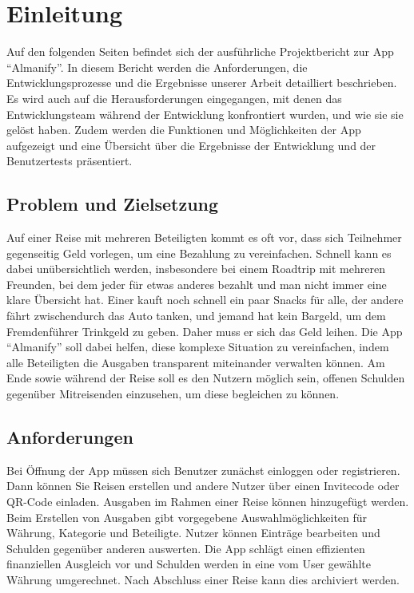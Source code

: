\section{Einleitung}

Auf den folgenden Seiten befindet sich der ausführliche Projektbericht zur App \enquote{Almanify}.
In diesem Bericht werden die Anforderungen, die Entwicklungsprozesse und die Ergebnisse unserer Arbeit detailliert beschrieben.
Es wird auch auf die Herausforderungen eingegangen, mit denen das Entwicklungsteam während der Entwicklung konfrontiert wurden, und wie sie sie gelöst haben.
Zudem werden die Funktionen und Möglichkeiten der App aufgezeigt und eine Übersicht über die Ergebnisse der Entwicklung und der Benutzertests präsentiert.

\subsection{Problem und Zielsetzung}

Auf einer Reise mit mehreren Beteiligten kommt es oft vor, dass sich Teilnehmer gegenseitig Geld vorlegen, um eine Bezahlung zu vereinfachen.
Schnell kann es dabei unübersichtlich werden, insbesondere bei einem Roadtrip mit mehreren Freunden,
bei dem jeder für etwas anderes bezahlt und man nicht immer eine klare Übersicht hat.
Einer kauft noch schnell ein paar Snacks für alle, der andere fährt zwischendurch das Auto tanken,
und jemand hat kein Bargeld, um dem Fremdenführer Trinkgeld zu geben.
Daher muss er sich das Geld leihen.
Die App \enquote{Almanify} soll dabei helfen, diese komplexe Situation zu vereinfachen, indem alle Beteiligten die Ausgaben transparent miteinander verwalten können.
Am Ende sowie während der Reise soll es den Nutzern möglich sein, offenen Schulden gegenüber Mitreisenden einzusehen, um diese begleichen zu können.

\subsection{Anforderungen}

Bei Öffnung der App müssen sich Benutzer zunächst einloggen oder registrieren.
Dann können Sie Reisen erstellen und andere Nutzer über einen Invitecode oder QR-Code einladen.
Ausgaben im Rahmen einer Reise können hinzugefügt werden.
Beim Erstellen von Ausgaben gibt vorgegebene Auswahlmöglichkeiten für Währung, Kategorie und Beteiligte.
Nutzer können Einträge bearbeiten und Schulden gegenüber anderen auswerten.
Die App schlägt einen effizienten finanziellen Ausgleich vor und Schulden werden in eine vom User gewählte Währung umgerechnet.
Nach Abschluss einer Reise kann dies archiviert werden.

